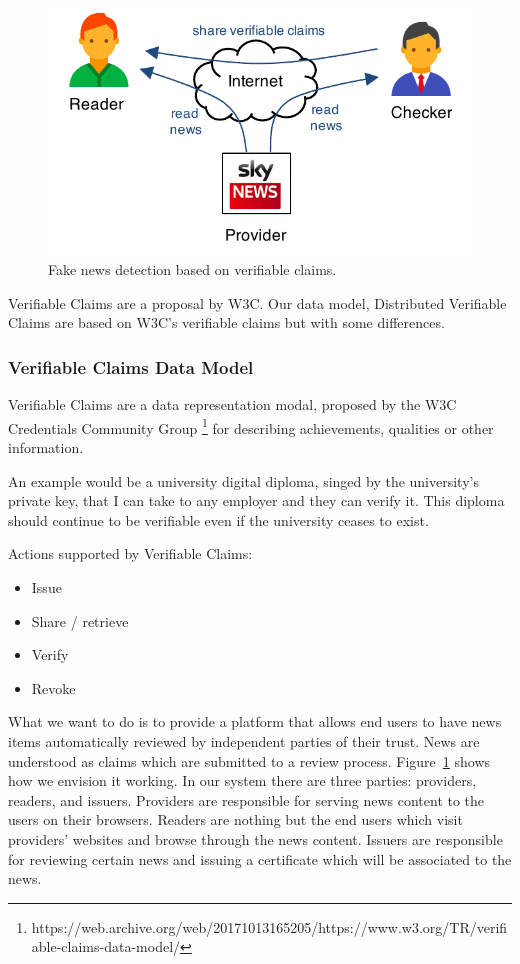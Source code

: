 \begin{figure}[t]
  \centering
  \includegraphics[width=0.9\columnwidth]{figures/model.pdf}
  \vspace{-10pt}
  \caption{Fake news detection based on verifiable claims.}
  \label{fig:model}
\end{figure}

Verifiable Claims are a proposal by W3C. Our data model, Distributed Verifiable Claims are based on W3C's verifiable claims but with some differences.

\subsubsection{Verifiable Claims Data Model}
Verifiable Claims are a data representation modal, proposed by the W3C Credentials Community Group \footnote{https://web.archive.org/web/20171013165205/https://www.w3.org/TR/verifiable-claims-data-model/} for describing achievements, qualities or other information.

An example would be a university digital diploma, singed by the university’s private key, that I can take to any employer and they can verify it. This diploma should continue to be verifiable even if the university ceases to exist.

Actions supported by Verifiable Claims:
\begin{itemize}
    \item Issue
    \item Share / retrieve
    \item Verify
    \item Revoke
\end{itemize}


What we want to do is to provide a platform that allows end users to have news items automatically reviewed by independent parties of their trust. News are understood as claims which are submitted to a review process. Figure~\ref{fig:model} shows how we envision it working. In our system there are three parties: providers, readers, and issuers. Providers are responsible for serving news content to the users on their browsers. Readers are nothing but the end users which visit providers' websites and browse through the news content. Issuers are responsible for reviewing certain news and issuing a certificate which will be associated to the news.

